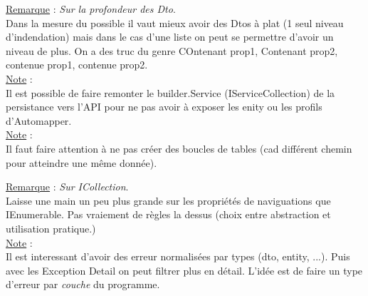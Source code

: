 \documentclass[a4paper,12pt,twoside]{article}
\newcommand{\rem}[2]{\noindent\underline{Remarque} : \textit{#1}.\\ \indent #2}
\newcommand{\note}[1]{\noindent\underline{Note} : \\ \indent #1}
\begin{document}
\rem{Sur la profondeur des Dto}{Dans la mesure du possible il vaut mieux avoir des Dtos à plat (1 seul niveau d'indendation) mais dans le cas d'une liste on peut se permettre d'avoir un niveau de plus. On a des truc du genre COntenant prop1, Contenant prop2, contenue prop1, contenue prop2.}\\

\note{Il est possible de faire remonter le builder.Service (IServiceCollection) de la persistance vers l'API pour ne pas avoir à exposer les enity ou les profils d'Automapper.}\\

\note{Il faut faire attention à ne pas créer des boucles de tables (cad différent chemin pour atteindre une même donnée).}

\rem{Sur ICollection}{Laisse une main un peu plus grande sur les propriétés de naviguations que IEnumerable. Pas vraiement de règles la dessus (choix entre abstraction et utilisation pratique.)}\\

\note{Il est interessant d'avoir des erreur normalisées par types (dto, entity, ...). Puis avec les Exception Detail on peut filtrer plus en détail. L'idée est de faire un type d'erreur par \textit{couche} du programme.}\\

\newpage
\printglossary[type=\acronymtype]%
\glsaddallunused %
\printglossary[type = main,nonumberlist]%
\end{document}
